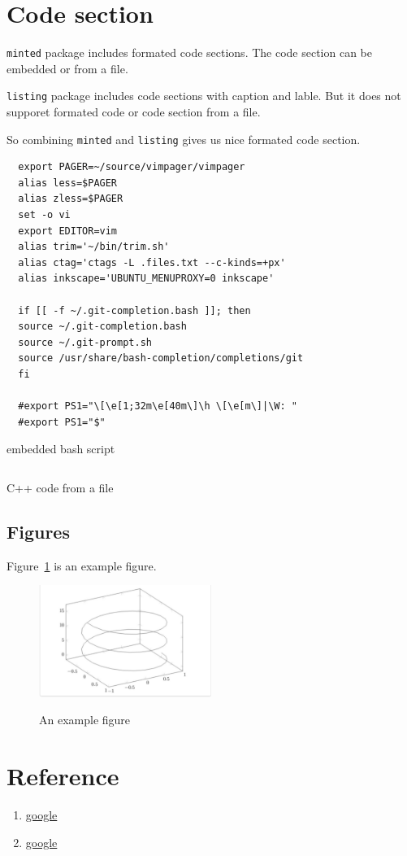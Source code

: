 \section{Code section}
\texttt{minted} package includes formated code sections. 
The code section can be embedded or from a file.

\texttt{listing} package includes code sections with caption and lable.
But it does not supporet formated code or code section from a file.

So combining \texttt{minted} and \texttt{listing} gives us nice formated code section.


\begin{listing}[!ht]
\begin{verbatim}
  export PAGER=~/source/vimpager/vimpager
  alias less=$PAGER
  alias zless=$PAGER
  set -o vi
  export EDITOR=vim
  alias trim='~/bin/trim.sh'
  alias ctag='ctags -L .files.txt --c-kinds=+px'
  alias inkscape='UBUNTU_MENUPROXY=0 inkscape'

  if [[ -f ~/.git-completion.bash ]]; then
  source ~/.git-completion.bash
  source ~/.git-prompt.sh
  source /usr/share/bash-completion/completions/git
  fi

  #export PS1="\[\e[1;32m\e[40m\]\h \[\e[m\]|\W: "
  #export PS1="$"
\end{verbatim}
\caption{embedded bash script}
\label{embedded_code_section}
\end{listing}

\begin{listing}[!ht]
  \inputminted[linenos]{cpp}{template/source/helloWorld.cpp}
\caption{C++ code from a file}
\label{file_code_section}
\end{listing}

\subsection{Figures}%
\label{sub:figures}

Figure~\ref{fig:Example} is an example figure.


\begin{figure}[h]
\caption{An example figure}
\centering
\includegraphics[width=0.5\textwidth]{./template/figure.pdf}
\label{fig:Example}
\end{figure}

\section{Reference}

\begin{enumerate}
  \item \href{https://www.google.com/}{google}
  \item \href{https://www.google.com/}{google}
\end{enumerate}
